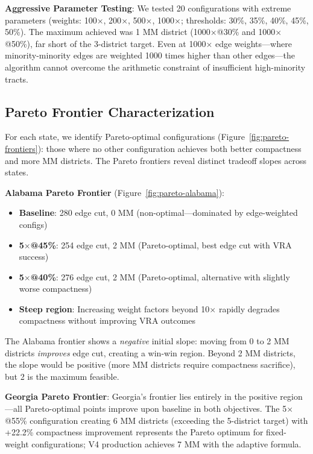 \textbf{Aggressive Parameter Testing}: We tested 20 configurations with extreme parameters (weights: 100$\times$, 200$\times$, 500$\times$, 1000$\times$; thresholds: 30\%, 35\%, 40\%, 45\%, 50\%). The maximum achieved was 1 MM district (1000$\times$@30\% and 1000$\times$@50\%), far short of the 3-district target. Even at 1000$\times$ edge weights---where minority-minority edges are weighted 1000 times higher than other edges---the algorithm cannot overcome the arithmetic constraint of insufficient high-minority tracts.

\subsection{Pareto Frontier Characterization}

For each state, we identify Pareto-optimal configurations (Figure~\ref{fig:pareto-frontiers}): those where no other configuration achieves both better compactness and more MM districts. The Pareto frontiers reveal distinct tradeoff slopes across states.

\textbf{Alabama Pareto Frontier} (Figure~\ref{fig:pareto-alabama}):
\begin{itemize}
    \item \textbf{Baseline}: 280 edge cut, 0 MM (non-optimal---dominated by edge-weighted configs)
    \item \textbf{5$\times$@45\%}: 254 edge cut, 2 MM (Pareto-optimal, best edge cut with VRA success)
    \item \textbf{5$\times$@40\%}: 276 edge cut, 2 MM (Pareto-optimal, alternative with slightly worse compactness)
    \item \textbf{Steep region}: Increasing weight factors beyond 10$\times$ rapidly degrades compactness without improving VRA outcomes
\end{itemize}

The Alabama frontier shows a \emph{negative} initial slope: moving from 0 to 2 MM districts \emph{improves} edge cut, creating a win-win region. Beyond 2 MM districts, the slope would be positive (more MM districts require compactness sacrifice), but 2 is the maximum feasible.

\textbf{Georgia Pareto Frontier}: Georgia's frontier lies entirely in the positive region---all Pareto-optimal points improve upon baseline in both objectives. The 5$\times$@55\% configuration creating 6 MM districts (exceeding the 5-district target) with +22.2\% compactness improvement represents the Pareto optimum for fixed-weight configurations; V4 production achieves 7 MM with the adaptive formula.

